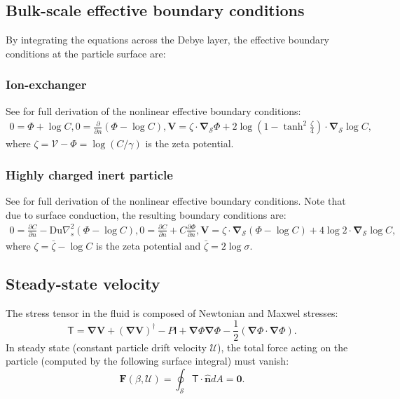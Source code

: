 \documentclass[preprint,10pt]{elsarticle}
\newcommand{\deriv}[2]{\frac{\partial #1}{\partial #2}}
\newcommand{\pars}[1]{\left(#1\right)}
\newcommand\bnabla{\boldsymbol{\nabla}}
\newcommand\bV{\boldsymbol{V}}
\newcommand\bF{\boldsymbol{F}}
\newcommand\bnhat{\hat{\boldsymbol{n}}}
\newcommand\bzero{\boldsymbol{0}}
\newcommand\Du{\text{Du}}
\newcommand\cU{\mathscr{U}}
\newcommand\cV{\mathscr{V}}
\newcommand\tI{\mathsf{I}}
\newcommand\tT{\mathsf{T}}
\begin{document}
\subsection{Bulk-scale effective boundary conditions}
By integrating the equations across the Debye layer,
the effective boundary conditions at the particle surface are:
\subsubsection{Ion-exchanger} See \cite{yariv2010migration} for full derivation
of the nonlinear effective boundary conditions:
\begin{align}
\label{eq:ionex_bnd}
0 = \varPhi + \log C, 0 = \deriv{}{n} \pars{\varPhi - \log C}, 
\bV = 
\zeta \cdot \bnabla_\mathcal{S} \varPhi 
+ 2\log\pars{1-\tanh^2\frac{\zeta}{4}} \cdot \bnabla_\mathcal{S} \log C,
\end{align}
where $\zeta = \cV - \varPhi = \log (C / \gamma)$ 
is the zeta potential.

\subsubsection{Highly charged inert particle}
See \cite{schnitzer2012surface} for full derivation
of the nonlinear effective boundary conditions. 
Note that due to surface conduction, the resulting boundary conditions are:
\begin{align} \label{eq:ephor_bnd}
0 = {\deriv{C}{n} - \Du \nabla^2_s \pars{\varPhi - \log C}}, 
0 = {\deriv{C}{n} + C \deriv{\varPhi}{n}}, 
\bV = \zeta \cdot \bnabla_\mathcal{S} \pars{\varPhi - \log C} +
4 \log 2 \cdot \bnabla_\mathcal{S} \log C,
\end{align}
where $\zeta = \bar{\zeta} - \log C$ 
is the zeta potential and $\bar{\zeta} = 2 \log \sigma$.

\subsection{Steady-state velocity}
The stress tensor in the fluid is composed of Newtonian and Maxwel stresses:
\begin{equation}
\label{eq:tensor}
\tT = \bnabla \bV + (\bnabla \bV)^\dagger - P \tI
+ \bnabla \varPhi \bnabla \varPhi - \frac{1}{2} (\bnabla \varPhi \cdot \bnabla \varPhi). 
\end{equation} 
In steady state (constant particle drift velocity $\cU$), the total force acting on the particle 
(computed by the following surface integral) must vanish:
\begin{equation} \label{eq:zero_force}
 \bF(\beta, \cU) = \oint_\mathcal{S} \tT \cdot \bnhat dA = \bzero.
\end{equation}
\end{document}
